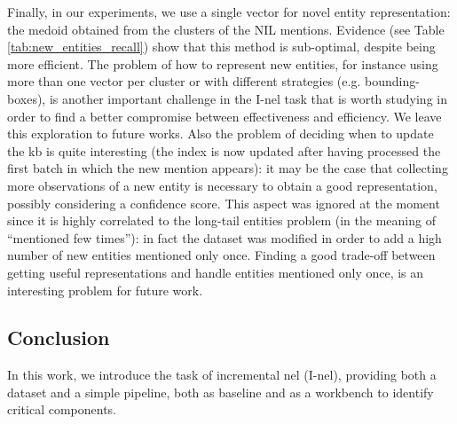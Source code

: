 
Finally, in our experiments, we use a single vector for novel entity representation: the medoid obtained from the clusters of the NIL mentions. Evidence (see Table \ref{tab:new_entities_recall}) show that this method is sub-optimal, despite being more efficient.
The problem of how to represent new entities, for instance using more than one vector per cluster or with different strategies (e.g. bounding-boxes), is another important challenge in the I-\ac{nel} task that is worth studying in order to find a better compromise between effectiveness and efficiency. We leave this exploration to future works.
Also the problem of deciding when to update the \ac{kb} is quite interesting (the index is now updated after having processed the first batch in which the new mention appears): it may be the case that collecting more observations of a new entity is necessary to obtain a good representation, possibly considering a confidence score.
This aspect was ignored at the moment since it is highly correlated to the long-tail entities problem (in the meaning of ``mentioned few times''): in fact the dataset was modified in order to add a high number of new entities mentioned only once.
Finding a good trade-off between getting useful representations and handle entities mentioned only once, is an interesting problem for future work.



\subsection{Conclusion}
In this work, we introduce the task of incremental \ac{nel} (I-\ac{nel}), providing both a dataset and a simple pipeline, both as baseline and as a workbench to identify critical components.

